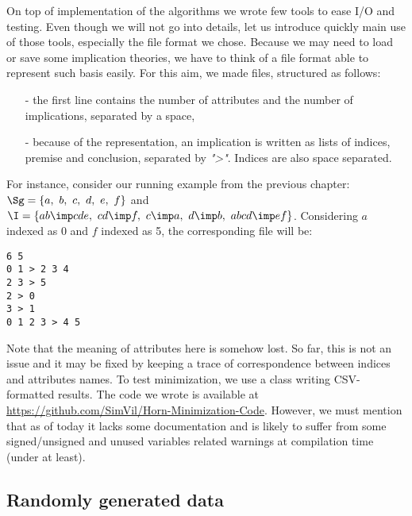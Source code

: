 \vspace{1.2em}

On top of implementation of the algorithms we wrote few tools to ease I/O and
testing. Even though we will not go into details, let us introduce quickly
main use of those tools, especially the file format we chose. Because we may need to load or save some implication theories, we have to think of a file format able to represent such basis easily. For this aim, we made 
files, structured as follows:
\begin{itemize}
	\item[-] the first line contains the number of attributes and the number of
	implications, separated by a space,
	\item[-] because of the  representation, an implication is 
	written as lists of indices, premise and conclusion, separated by \textit{">"}. Indices are also space separated.
\end{itemize}
For instance, consider our running example from the previous chapter:
$\Sg = \{ a, \ b, \  c, \  d, \  e, \ f \}$ and $\I = \{ ab \imp cde, \ cd \imp f, \ c \imp a, \ d \imp b, \  abcd \imp  ef \}$. Considering $a$ indexed as 0 and $f$ indexed as 5, the corresponding  file will be:

\begin{lstlisting}[language = inline, style = Light]
6 5
0 1 > 2 3 4
2 3 > 5
2 > 0
3 > 1
0 1 2 3 > 4 5
\end{lstlisting}

\noindent Note that the meaning of attributes here is somehow lost. So far, this is not an issue and it may be fixed by keeping a trace of correspondence between indices and attributes names. To test minimization, we use a class
 writing CSV-formatted results. The code we wrote is available at \url{https://github.com/SimVil/Horn-Minimization-Code}. However, we must mention that as of today it lacks some documentation and is likely to suffer from some signed/unsigned and unused variables related warnings at compilation time (under  at least). 

\subsection{Randomly generated data}

